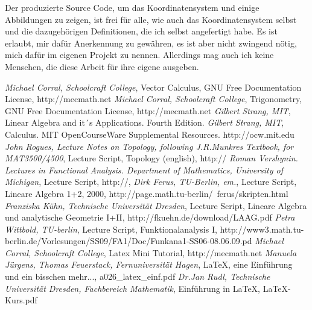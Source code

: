 \documentclass[a4paper]{article}
\begin{document}
Der produzierte Source Code, um das Koordinatensystem und einige Abbildungen zu zeigen, ist frei f\"ur alle,
wie auch das Koordinatensystem selbst und die dazugeh\"origen Definitionen, die ich selbst angefertigt habe.
Es ist erlaubt, mir daf\"ur Anerkennung zu gew\"ahren, es ist aber nicht zwingend n\"otig, mich daf\"ur im
eigenen Projekt zu nennen. Allerdings mag auch ich keine Menschen, die diese Arbeit f\"ur ihre eigene ausgeben.\\


\begin{thebibliography}
    \textit{Michael Corral, Schoolcraft College},
        Vector Calculus, GNU Free Documentation License, http://mecmath.net
     \textit{Michael Corral, Schoolcraft College},
        Trigonometry, GNU Free Documentation License, http://mecmath.net 
     \textit{Gilbert Strang, MIT},
            Linear Algebra and it´s Applications. Fourth Edition.        
     \textit{Gilbert Strang, MIT},
            Calculus. MIT OpenCourseWare Supplemental Resources. http://ocw.mit.edu    
     \textit{John Rogues, Lecture Notes on Topology, following J.R.Munkres Textbook, for MAT3500/4500},
            Lecture Script, Topology (english), http://
     \textit{Roman Vershynin. Lectures in Functional Analysis. Department of Mathematics, University of Michigan},
            Lecture Script, http://,        
     \textit{Dirk Ferus, TU-Berlin, em.},
            Lecture Script, Lineare Algebra 1+2, 2000, http://page.math.tu-berlin/~ferus/skripten.html
     \textit{Franziska K\"uhn, Technische Universit\"at Dresden},
            Lecture Script, Lineare Algebra und analytische Geometrie I+II, http://fkuehn.de/download/LAAG.pdf
     \textit{Petra Wittbold, TU-berlin},  
            Lecture Script, Funktionalanalysis I,  http://www3.math.tu-berlin.de/Vorlesungen/SS09/FA1/Doc/Funkana1-SS06-08.06.09.pd
     \textit{Michael Corral, Schoolcraft College},
            Latex Mini Tutorial, http://mecmath.net                    
     \textit{Manuela J\"urgens, Thomas Feuerstack, Fernuniversit\"at Hagen},
            LaTeX, eine Einf\"uhrung und ein bisschen mehr..., a026\_latex\_einf.pdf            
     \textit{Dr.Jan Rudl, Technische Universit\"at Dresden, Fachbereich Mathematik},
            Einf\"uhrung in LaTeX, LaTeX-Kurs.pdf

            \end{thebibliography}




\printindex
\end{document}

